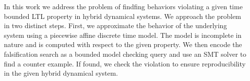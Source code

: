 In this work we address the problem of findfing behaviors violating a
given time bounded LTL property in hybrid dynamical systems. We
approach the problem in two distinct steps. First, we approximate the
behavior of the underlying system using a piecewise affine discrete
time model. The model is incomplete in nature and is computed with
respect to the given property.  We then encode the falsification
search as a bounded model checking query and use an SMT solver to find
a counter example. If found, we check the violation to ensure
reproducibility in the given hybrid dynamical system.

